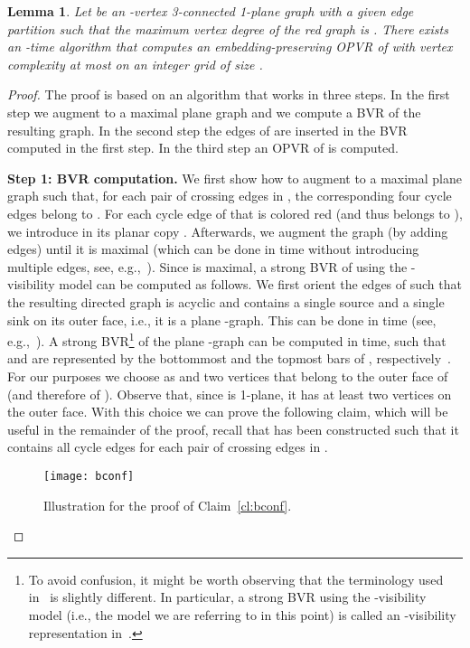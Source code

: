 \documentclass{article}
\newtheorem{lemma}{Lemma}
\newcommand{\opvr}{OPVR\xspace}
\begin{document}
\begin{lemma}\label{le:decomp-opvr}
Let  be an -vertex 3-connected 1-plane graph with a given edge partition such that the maximum vertex degree of the red graph is . There exists an -time algorithm that computes an embedding-preserving \opvr of  with vertex complexity at most  on an integer grid of size .
\end{lemma}
\begin{proof}
The proof is based on an algorithm that works in three steps. In the first step we augment  to a maximal plane graph and we compute a BVR of the resulting graph. In the second step the edges of  are inserted in the BVR computed in the first step. In the third step an \opvr of  is computed.


\smallskip\noindent\textbf{Step 1: BVR computation.} We first show how to augment  to a maximal plane graph  such that, for each pair of crossing edges in , the corresponding four cycle edges belong to . For each cycle edge  of  that is colored red (and thus belongs to ), we introduce in  its planar copy . Afterwards, we augment the graph (by adding edges) until it is maximal  (which can be done in  time without introducing multiple edges, see, e.g.,~\cite{DBLP:conf/swat/KantB92}). Since  is maximal, a strong BVR of  using the -visibility model can be computed as follows. We first orient the edges of  such that the resulting directed graph is acyclic and contains a single source  and a single sink  on its outer face, i.e., it is a plane -graph. This can be done in  time (see, e.g.,~\cite{DBLP:journals/dcg/RosenstiehlT86,TamassiaTollis86}). A strong BVR\footnote{To avoid confusion, it might be worth observing that the terminology used in~\cite{TamassiaTollis86} is slightly different. In particular, a strong BVR using the -visibility model (i.e., the model we are referring to in this point) is called an -visibility representation in~\cite{TamassiaTollis86}. }  of the plane -graph  can be computed in  time, such that  and  are represented by the bottommost and the topmost bars of , respectively~\cite{TamassiaTollis86}.
For our purposes we choose as  and  two vertices that belong to the outer face of  (and therefore of ). Observe that, since  is 1-plane, it has at least two vertices on the outer face.  With this choice we can prove the following claim, which will be useful in the remainder of the proof, recall that  has been constructed such that it contains all cycle edges for each pair of crossing edges in .


\begin{figure}[t]
    \centering
    \texttt{[image: bconf]}
    \caption{Illustration for the proof of Claim~\ref{cl:bconf}.\label{fi:transitive}}
\end{figure}



\end{proof}
\end{document}
